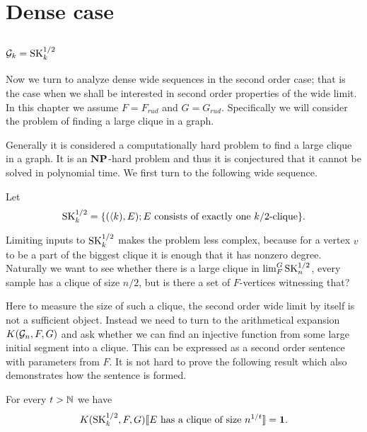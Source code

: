 \chapter{Dense case}\label{chapdense}

\section{$\mathcal{G}_k=\text{SK}_k^{1/2}$}

Now we turn to analyze dense wide sequences in the second order case; that is the case when we shall be interested in second order properties of the wide limit. In this chapter we assume $F=F_{rud}$ and $G=G_{rud}$. Specifically we will consider the problem of finding a large clique in a graph. 

Generally it is considered a computationally hard problem to find a large clique in a graph. It is an $\textbf{NP}$-hard problem and thus it is conjectured that it cannot be solved in polynomial time. We first turn to the following wide sequence.

\begin{defi}
Let \[\text{SK}_k^{1/2}=\{(\langle k),E);\text{$E$ consists of exactly one $k/2$-clique}\}.\]
\end{defi}

Limiting inputs to $\text{SK}_k^{1/2}$ makes the problem less complex, because for a vertex $v$ to be a part of the biggest clique it is enough that it has nonzero degree. Naturally we want to see whether there is a large clique in $\lim_F^G \text{SK}_n^{1/2}$, every sample has a clique of size $n/2$, but is there a set of $F$-vertices witnessing that? 

Here to measure the size of such a clique, the second order wide limit  by itself is not a sufficient object. Instead we need to turn to the arithmetical expansion $K(\mathcal{G}_n,F,G)$ and ask whether we can find an injective function from some large initial segment into a clique. This can be expressed as a second order sentence with parameters from $F$. It is not hard to prove the following result which also demonstrates how the sentence is formed.

\begin{thrm}\label{thrmsk1}For every $t>\mathbb{N}$ we have
\[K(\text{SK}_k^{1/2},F,G)\llbracket\text{$E$ has a clique of size $n^{1/t}$}\rrbracket=\textbf{1}.\]

\end{thrm}

